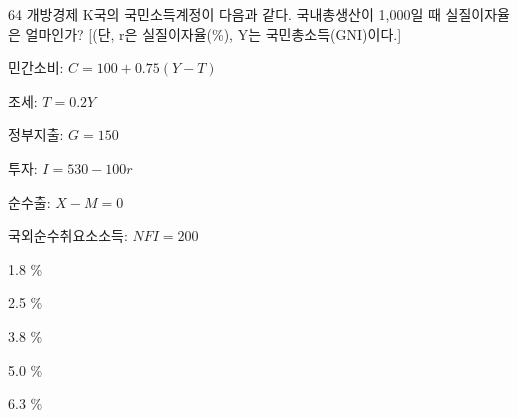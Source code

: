 \begin{question}{64}
개방경제 K국의 국민소득계정이 다음과 같다. 국내총생산이 1,000일 때 실질이자율은 얼마인가? [(단, r은 실질이자율(\%), Y는 국민총소득(GNI)이다.]
\begin{framedtext}
민간소비: $C=100+0.75(Y-T)$ \par
조세: $T=0.2Y$ \par
정부지출: $G=150$ \par
투자: $I=530-100r$ \par
순수출: $X-M=0$ \par
국외순수취요소소득: $NFI=200$ \par
\end{framedtext}
\begin{choices}
  \item 1.8 \%
  \item 2.5 \%
  \item 3.8 \%
  \item 5.0 \%
  \item 6.3 \%
\end{choices}
\end{question}
